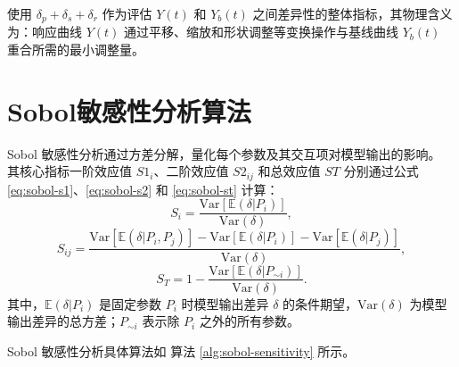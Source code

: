使用 $\delta_p + \delta_s + \delta_r$ 作为评估 $Y(t)$ 和 $Y_b(t)$ 之间差异性的整体指标，其物理含义为：响应曲线 $Y(t)$ 通过平移、缩放和形状调整等变换操作与基线曲线 $Y_b(t)$ 重合所需的最小调整量。

\section{Sobol敏感性分析算法}\label{sec:sa-sobol-algo}

Sobol 敏感性分析通过方差分解，量化每个参数及其交互项对模型输出的影响。
其核心指标一阶效应值 $ S1_i $、二阶效应值 $ S2_{ij} $ 和总效应值 $ ST $ 分别通过公式 \eqref{eq:sobol-s1}、\eqref{eq:sobol-s2} 和 \eqref{eq:sobol-st} 计算：
\begin{equation}\label{eq:sobol-s1}
    S_i = \frac{\mathrm{Var}[\mathbb{E}(\delta|P_i)]}{\mathrm{Var}(\delta)},
\end{equation}
\begin{equation}\label{eq:sobol-s2}
    S_{ij} = \frac{\mathrm{Var}[\mathbb{E}(\delta|P_i,P_j)] - \mathrm{Var}[\mathbb{E}(\delta|P_i)] - \mathrm{Var}[\mathbb{E}(\delta|P_j)]}{\mathrm{Var}(\delta)},
\end{equation}
\begin{equation}\label{eq:sobol-st}
    S_T = 1 - \frac{\mathrm{Var}[\mathbb{E}(\delta|P_{\sim i})]}{\mathrm{Var}(\delta)}.
\end{equation}
其中，$ \mathbb{E}(\delta|P_i) $ 是固定参数 $ P_i $ 时模型输出差异 $\delta$ 的条件期望，$ \mathrm{Var}(\delta) $ 为模型输出差异的总方差；$ P_{\sim i} $ 表示除 $ P_i $ 之外的所有参数。

Sobol 敏感性分析具体算法如 算法 \ref{alg:sobol-sensitivity} 所示。

